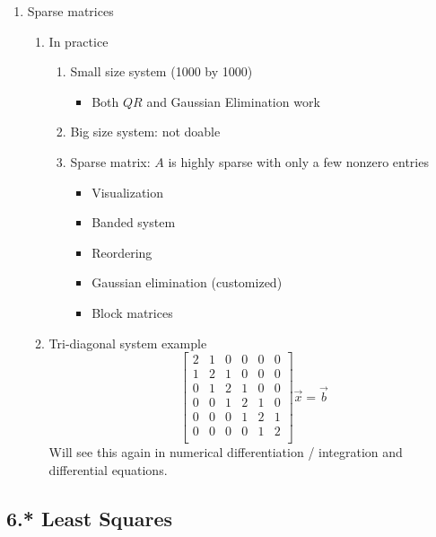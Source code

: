 \documentclass{article}
\theoremstyle{remark}
\begin{document}
\begin{enumerate}
\item Sparse matrices
\begin{enumerate}
\item In practice
\begin{enumerate}
\item Small size system (1000 by 1000)
\begin{itemize}
\item Both $QR$ and Gaussian Elimination work
\end{itemize}
\item Big size system: not doable
\item Sparse matrix: $A$ is highly sparse with only a few nonzero entries
\begin{itemize}
\item Visualization
\item Banded system
\item Reordering
\item Gaussian elimination (customized)
\item Block matrices
\end{itemize}
\end{enumerate}
\item Tri-diagonal system example
$$
\begin{bmatrix}
2 & 1 & 0 & 0 & 0 & 0 \\
1 & 2 & 1 & 0 & 0 & 0 \\
0 & 1 & 2 & 1 & 0 & 0 \\
0 & 0 & 1 & 2 & 1 & 0 \\
0 & 0 & 0 & 1 & 2 & 1 \\
0 & 0 & 0 & 0 & 1 & 2 \\
\end{bmatrix}\vec x = \vec b
$$
Will see this again in numerical differentiation / integration and differential equations.
\end{enumerate}
\end{enumerate}


\subsection{6.* Least Squares}
\end{document}
